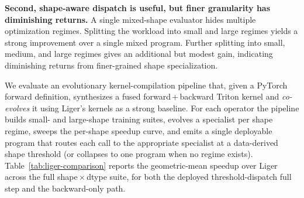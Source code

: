 \documentclass[11pt]{article}
\begin{document}
\noindent
\textbf{Second, shape-aware dispatch is useful, but finer granularity has diminishing returns.}
A single mixed-shape evaluator hides multiple optimization regimes. Splitting the workload into small and large regimes yields a strong improvement over a single mixed program. Further splitting into small, medium, and large regimes gives an additional but modest gain, indicating diminishing returns from finer-grained shape specialization.

\newpage

We evaluate an evolutionary kernel-compilation pipeline that, given a PyTorch forward
definition, synthesizes a fused forward\,+\,backward Triton kernel and \emph{co-evolves}
it using Liger's kernels as a strong baseline. For each operator the
pipeline builds small- and large-shape training suites, evolves a specialist per shape
regime, sweeps the per-shape speedup curve, and emits a single deployable program that
routes each call to the appropriate specialist at a data-derived shape threshold (or
collapses to one program when no regime exists). Table~\ref{tab:liger-comparison} reports
the geometric-mean speedup over Liger across the full shape\,$\times$\,dtype suite, for
both the deployed threshold-dispatch full step and the backward-only path. 
\end{document}
